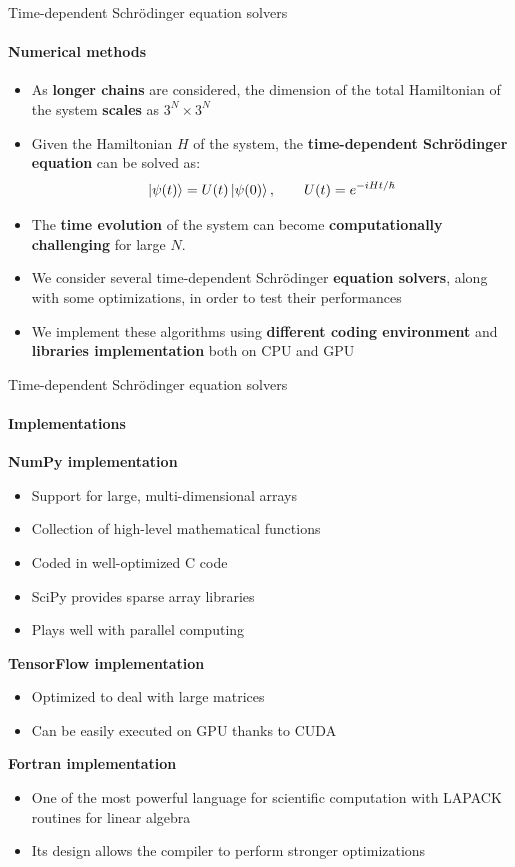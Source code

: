 \documentclass[8pt]{beamer}
\begin{document}
\begin{frame}[c]{Time-dependent Schr{\"o}dinger equation solvers
}
\framesubtitle{Numerical methods}

\begin{itemize}
    \item As \textbf{longer chains} are considered, the dimension of the total Hamiltonian of the system \textbf{scales} as $3^N \times 3^N$
    \item Given the Hamiltonian $H$ of the system, the \textbf{time-dependent Schrödinger equation} can be solved as:
    \begin{equation*}
        \left\vert{\psi(t)}\right\rangle = U(t) \left\vert{\psi(0)}\right\rangle, \qquad U(t)=e^{-iHt/\hbar}
    \end{equation*}
    \item The \textbf{time evolution} of the system can become \textbf{computationally challenging} for large $N$.
    \item We consider several time-dependent Schr{\"o}dinger \textbf{equation solvers}, along with some optimizations, in order to test their performances
    \item We implement these algorithms using \textbf{different coding environment} and \textbf{libraries implementation} both on CPU and GPU
\end{itemize}

\end{frame}

\begin{frame}[c]{Time-dependent Schr{\"o}dinger equation solvers
}
\framesubtitle{Implementations}

\textbf{NumPy implementation}
\begin{itemize}
    \item Support for large, multi-dimensional arrays
    \item Collection of high-level mathematical functions
    \item Coded in well-optimized C code
    \item SciPy provides sparse array libraries
    \item Plays well with parallel computing
\end{itemize}
\vspace{0.5cm}
\textbf{TensorFlow implementation}
\begin{itemize}
    \item Optimized to deal with large matrices
    \item Can be easily executed on GPU thanks to CUDA
\end{itemize}
\vspace{0.5cm}
\textbf{Fortran implementation}
\begin{itemize}
    \item One of the most powerful language for scientific computation with LAPACK routines for linear algebra
    \item Its design allows the compiler to perform stronger optimizations
\end{itemize}

\end{frame}
\end{document}
